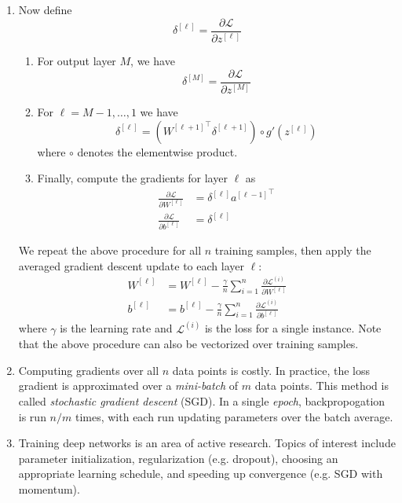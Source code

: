 \documentclass[10pt]{article}
\begin{document}
\begin{multicols}{2}
\begin{addmargin}[0.8em]{0.5em}
\begin{enumerate}[label=(\alph*)]
        \item Now define 
        $$
        \delta^{[\ell]} = \frac{\partial \mathcal{L}}{\partial z^{[\ell]}}
        $$
        \begin{enumerate}[1.]
            \item For output layer $M$, we have
            $$
            \delta^{[M]} = \frac{\partial \mathcal{L}}{\partial z^{[M]}}
            $$
            \item For $\ell=M-1, \hdots, 1$ we have
            $$
            \delta^{[\ell]} = ({W^{[\ell + 1]}}^\top \delta^{[\ell + 1]}) \circ g'(z^{[\ell]})
            $$
            where $\circ$ denotes the elementwise product.
            \item Finally, compute the gradients for layer $\ell$ as
            \begin{align*}
                \frac{\partial \mathcal{L}}{\partial W^{[\ell]}} &= \delta^{[\ell]} {a^{[\ell - 1]}}^\top \\
                \frac{\partial \mathcal{L}}{\partial b^{[\ell]}} &= \delta^{[\ell]} 
            \end{align*}
        \end{enumerate}
        We repeat the above procedure for all $n$ training samples, then apply the averaged gradient descent update to each layer $\ell$:
        \begin{align*}
            W^{[\ell]} &= W^{[\ell]} - \frac{\gamma}{n} \sum_{i=1}^{n} \frac{\partial \mathcal{L}^{(i)}}{\partial W^{[\ell]}} \\
            b^{[\ell]} &= b^{[\ell]} - \frac{\gamma}{n} \sum_{i=1}^{n} \frac{\partial \mathcal{L}^{(i)}}{\partial b^{[\ell]}} 
        \end{align*}
        where $\gamma$ is the learning rate and $\mathcal{L}^{(i)}$ is the loss for a single instance. Note that the above procedure can also be vectorized over training samples.
        
        \item Computing gradients over all $n$ data points is costly. In practice, the loss gradient is approximated over a \textit{mini-batch} of $m$ data points. This method is called \textit{stochastic gradient descent} (SGD). In a single \textit{epoch}, backpropogation is run $n/m$ times, with each run updating parameters over the batch average.
        
        \item Training deep networks is an area of active research. Topics of interest include parameter initialization, regularization (e.g. dropout), choosing an appropriate learning schedule, and speeding up convergence (e.g. SGD with momentum). 
    \end{enumerate} 
    \vspace{-0.6cm}
\end{addmargin}


\end{multicols}
\end{document}
